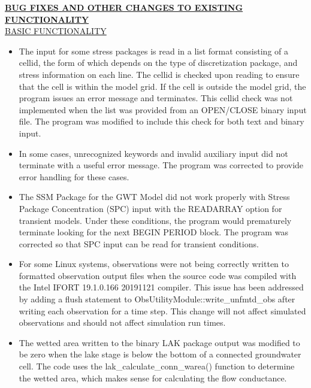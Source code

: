 	\textbf{\underline{BUG FIXES AND OTHER CHANGES TO EXISTING FUNCTIONALITY}} \\
	\underline{BASIC FUNCTIONALITY}
	\begin{itemize}
		\item The input for some stress packages is read in a list format consisting of a cellid, the form of which depends on the type of discretization package, and stress information on each line.  The cellid is checked upon reading to ensure that the cell is within the model grid.  If the cell is outside the model grid, the program issues an error message and terminates.  This cellid check was not implemented when the list was provided from an OPEN/CLOSE binary input file.  The program was modified to include this check for both text and binary input.
		\item In some cases, unrecognized keywords and invalid auxiliary input did not terminate with a useful error message. The program was corrected to provide error handling for these cases.
		\item The SSM Package for the GWT Model did not work properly with Stress Package Concentration (SPC) input with the READARRAY option for transient models.  Under these conditions, the program would prematurely terminate looking for the next BEGIN PERIOD block.  The program was corrected so that SPC input can be read for transient conditions.
		\item For some Linux systems, observations were not being correctly written to formatted observation output files when the source code was compiled with the Intel IFORT 19.1.0.166 20191121 compiler. This issue has been addressed by adding a flush statement to ObsUtilityModule::write\_unfmtd\_obs after writing each observation for a time step. This change will not affect simulated observations and should not affect simulation run times.
		\item The wetted area written to the binary LAK package output was modified to be zero when the lake stage is below the bottom of a connected groundwater cell.  The code uses the lak\_calculate\_conn\_warea() function to determine the wetted area, which makes sense for calculating the flow conductance.
	\end{itemize}

